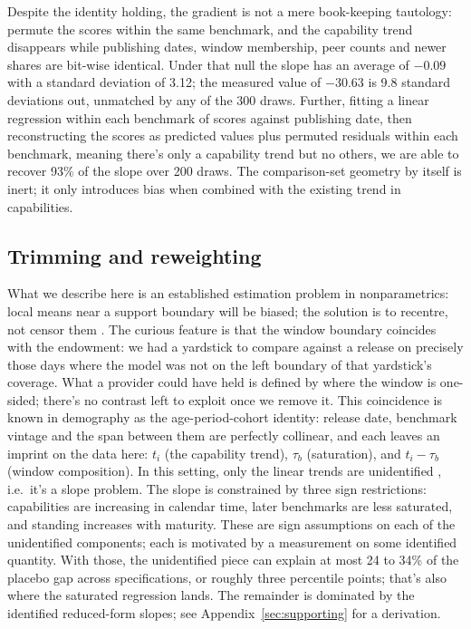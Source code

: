 \documentclass{article}
\begin{document}
Despite the identity holding, the gradient is not a mere book-keeping tautology: permute the scores within the same benchmark, and the capability trend disappears while publishing dates, window membership, peer counts and newer shares are bit-wise identical. Under that null the slope has an average of $-0.09$ with a standard deviation of 3.12; the measured value of $-30.63$ is 9.8 standard deviations out, unmatched by any of the 300 draws. Further, fitting a linear regression within each benchmark of scores against publishing date, then reconstructing the scores as predicted values plus permuted residuals within each benchmark, meaning there's only a capability trend but no others, we are able to recover 93\% of the slope over 200 draws. The comparison-set geometry by itself is inert; it only introduces bias when combined with the existing trend in capabilities.

\subsection{Trimming and reweighting}\label{sec:core-recentring}

What we describe here is an established estimation problem in nonparametrics: local means near a support boundary will be biased; the solution is to recentre, not censor them \citep{gasser1979,fan1992}. The curious feature is that the window boundary coincides with the endowment: we had a yardstick to compare against a release on precisely those days where the model was not on the left boundary of that yardstick's coverage. What a provider could have held is defined by where the window is one-sided; there's no contrast left to exploit once we remove it. This coincidence is known in demography as the age-period-cohort identity: release date, benchmark vintage and the span between them are perfectly collinear, and each leaves an imprint on the data here: $t_i$ (the capability trend), $\tau_b$ (saturation), and $t_i - \tau_b$ (window composition). In this setting, only the linear trends are unidentified \citep{fosse2019bounding,fosse2019review}, i.e.\ it's a slope problem. The slope is constrained by three sign restrictions: capabilities are increasing in calendar time, later benchmarks are less saturated, and standing increases with maturity. These are sign assumptions on each of the unidentified components; each is motivated by a measurement on some identified quantity. With those, the unidentified piece can explain at most 24 to 34\% of the placebo gap across specifications, or roughly three percentile points; that's also where the saturated regression lands. The remainder is dominated by the identified reduced-form slopes; see Appendix~\ref{sec:supporting} for a derivation.
\end{document}
